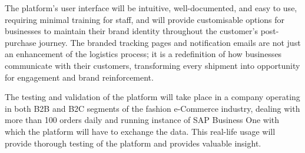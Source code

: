 The platform's user interface will be intuitive, well-documented, and easy to use, requiring minimal training for staff, and will provide customisable options for businesses to maintain their brand identity throughout the customer's post-purchase journey.
The branded tracking pages and notification emails are not just an enhancement of the logistics process; it is a redefinition of how businesses communicate with their customers, transforming every shipment into opportunity for engagement and brand reinforcement.

The testing and validation of the platform will take place in a company operating in both \ac{B2B} and \ac{B2C} segments of the fashion e-Commerce industry, dealing with more than 100 orders daily and running instance of SAP Business One with which the platform will have to exchange the data. 
This real-life usage will provide thorough testing of the platform and provides valuable insight.
